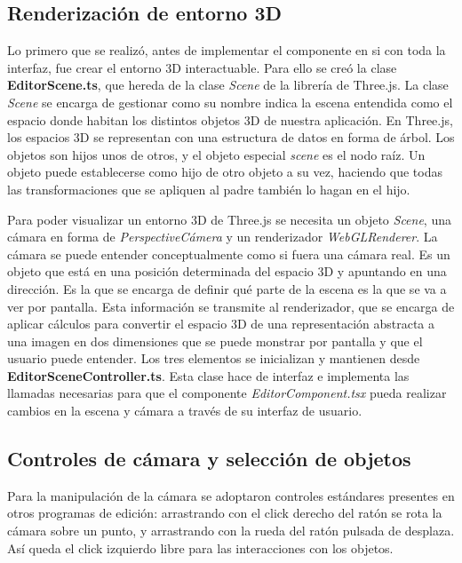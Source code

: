 \subsection{Renderización de entorno 3D}

Lo primero que se realizó, antes de implementar el componente en si con toda la interfaz, fue crear el entorno 3D interactuable. Para ello se creó la clase \textbf{EditorScene.ts}, que hereda de la clase \textit{Scene} de la librería de Three.js. La clase \textit{Scene} se encarga de gestionar como su nombre indica la escena entendida como el espacio donde habitan los distintos objetos 3D de nuestra aplicación. En Three.js, los espacios 3D se representan con una estructura de datos en forma de árbol. Los objetos son hijos unos de otros, y el objeto especial \textit{scene} es el nodo raíz. Un objeto puede establecerse como hijo de otro objeto a su vez, haciendo que todas las transformaciones que se apliquen al padre también lo hagan en el hijo.

Para poder visualizar un entorno 3D de Three.js se necesita un objeto \textit{Scene}, una cámara en forma de \textit{PerspectiveCámera} y un renderizador \textit{WebGLRenderer}. La cámara se puede entender conceptualmente como si fuera una cámara real. Es un objeto que está en una posición determinada del espacio 3D y apuntando en una dirección. Es la que se encarga de definir qué parte de la escena es la que se va a ver por pantalla. Esta información se transmite al renderizador, que se encarga de aplicar cálculos para convertir el espacio 3D de una representación abstracta a una imagen en dos dimensiones que se puede monstrar por pantalla y que el usuario puede entender. Los tres elementos se inicializan y mantienen desde \textbf{EditorSceneController.ts}. Esta clase hace de interfaz e implementa las llamadas necesarias para que el componente \textit{EditorComponent.tsx} pueda realizar cambios en la escena y cámara a través de su interfaz de usuario.

\subsection{Controles de cámara y selección de objetos}

Para la manipulación de la cámara se adoptaron controles estándares presentes en otros programas de edición: arrastrando con el click derecho del ratón se rota la cámara sobre un punto, y arrastrando con la rueda del ratón pulsada de desplaza. Así queda el click izquierdo libre para las interacciones con los objetos.

